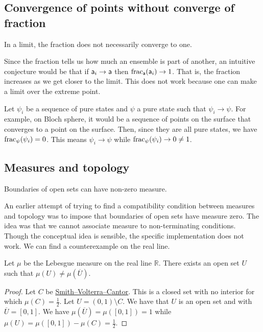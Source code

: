 \subsection{Convergence of points without converge of fraction}

\begin{insight}
	In a limit, the fraction does not necessarily converge to one.
\end{insight}

Since the fraction tells us how much an ensemble is part of another, an intuitive conjecture would be that if $\ens[a]_i \to \ens[a]$ then $\size_{\ens[a]}(\ens[a]_i) \to 1$. That is, the fraction increases as we get closer to the limit. This does not work because one can make a limit over the extreme point.

\begin{example}
	Let $\psi_i$ be a sequence of pure states and $\psi$ a pure state such that $\psi_i \to \psi$. For example, on Bloch sphere, it would be a sequence of points on the surface that converges to a point on the surface. Then, since they are all pure states, we have $\size_{\psi}(\psi_i) = 0$. This means $\psi_i \to \psi$ while $\size_{\psi}(\psi_i) \to 0 \neq 1$.
\end{example}

\subsection{Measures and topology}

\begin{insight}
	Boundaries of open sets can have non-zero measure.
\end{insight}

An earlier attempt of trying to find a compatibility condition between measures and topology was to impose that boundaries of open sets have measure zero. The idea was that we cannot associate measure to non-terminating conditions. Though the conceptual idea is sensible, the specific implementation does not work. We can find a counterexample on the real line. 

\begin{prop}
	Let $\mu$ be the Lebesgue measure on the real line $\mathbb{R}$. There exists an open set $U$ such that $\mu(U) \neq \mu(\overline{U})$.
\end{prop}

\begin{proof}
	Let $C$ be \href{https://en.wikipedia.org/wiki/Smith%E2%80%93Volterra%E2%80%93Cantor_set}{Smith–Volterra–Cantor}. This is a closed set with no interior for which $\mu(C) = \frac{1}{2}$. Let $U = (0,1) \setminus C$. We have that $U$ is an open set and with $\overline{U} = [0,1]$. We have $\mu(\overline{U}) = \mu([0,1]) = 1$ while $\mu(U) = \mu([0,1]) - \mu(C) = \frac{1}{2}$.
\end{proof}

